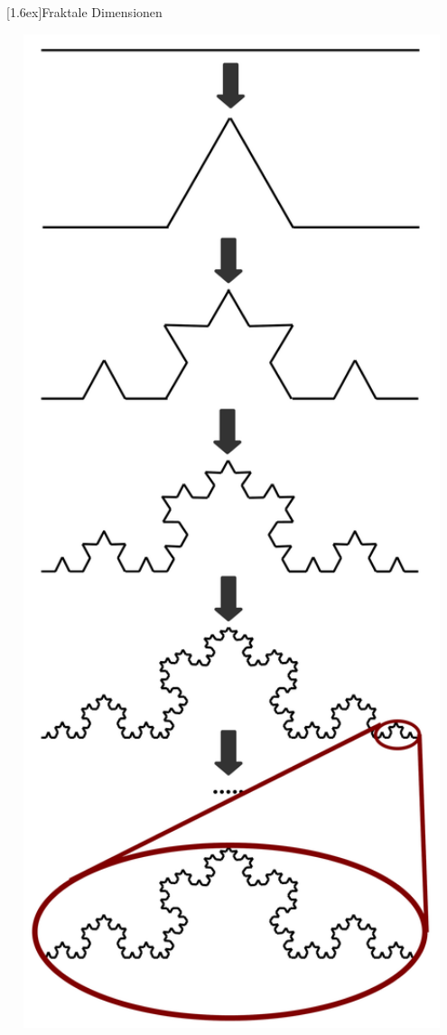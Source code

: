 \documentclass[final]{beamer}
\newlength{\columnheight}
\newlength{\marginw}
\newlength{\tw}
\newlength{\colw}
\newenvironment{myTwoColPoster}{%
  \begin{minipage}[t]{\textwidth}%
    \hspace*{\marginw}%
    \hspace*{9.5bp}%
    \begin{minipage}[t]{\tw}}%
  {\end{minipage}%
   \hspace*{\marginw}%
   \end{minipage}}
\newenvironment{myCol}%
    {\begin{minipage}[t][\columnheight][t]{\colw}}%
    {\end{minipage}}
\newenvironment{textblock}[1]%
    {\begin{block}{\rule[-0.6ex]{0pt}{2.4ex}\raisebox{-0.25ex}[1.6ex]{#1}}%
     \vspace*{5mm}}%
    {\vspace*{5mm}\end{block}}
\begin{document}
\begin{frame}[t]{}
\begin{myTwoColPoster}
\begin{myCol}
\begin{textblock}{Fraktale Dimensionen}
\begin{minipage}[c]{0.22\textwidth}
    \includegraphics[width=0.99\textwidth]{fig/Koch3}

\end{minipage}
\end{textblock}
\end{myCol}
\end{myTwoColPoster}
\end{frame}
\end{document}
